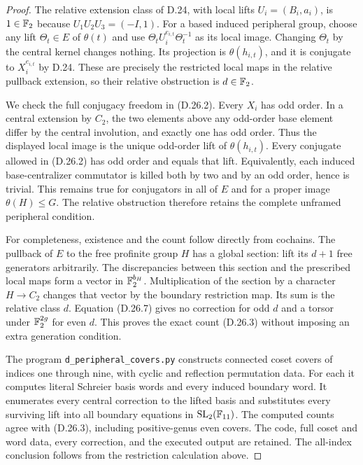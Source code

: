 \begin{proof}
The relative extension class of D.24, with local lifts
$U_i=(B_i,a_i)$, is $1\in\mathbb F_2$ because
$U_1U_2U_3=(-I,1)$.  For a based induced peripheral group,
choose any lift $\Theta_t\in E$ of $\theta(t)$ and use
$\Theta_t U_i^{e_{i,t}}\Theta_t^{-1}$ as its local image.
Changing $\Theta_t$ by the central kernel changes nothing.
Its projection is $\theta(h_{i,t})$, and it is conjugate to
$X_i^{e_{i,t}}$ by D.24.  These are precisely the restricted
local maps in the relative pullback extension, so their relative
obstruction is $d\in\mathbb F_2$.

We check the full conjugacy freedom in \textup{(D.26.2)}.
Every $X_i$ has odd order.  In a central extension by $C_2$,
the two elements above any odd-order base element differ by the
central involution, and exactly one has odd order.  Thus the
displayed local image is the unique odd-order lift of
$\theta(h_{i,t})$.  Every conjugate allowed in
\textup{(D.26.2)} has odd order and equals that lift.
Equivalently, each induced base-centralizer commutator is killed
both by two and by an odd order, hence is trivial.  This remains
true for conjugators in all of $E$ and for a proper image
$\theta(H)\leq G$.  The relative obstruction therefore retains
the complete unframed peripheral condition.

For completeness, existence and the count follow directly from
cochains.  The pullback of $E$ to the free profinite group $H$
has a global section: lift its $d+1$ free generators arbitrarily.
The discrepancies between this section and the prescribed local
maps form a vector in $\mathbb F_2^{b_H}$.  Multiplication of the
section by a character $H\to C_2$ changes that vector by the
boundary restriction map.  Its sum is the relative class $d$.
Equation \textup{(D.26.7)} gives no correction for odd $d$ and
a torsor under $\mathbb F_2^{2g}$ for even $d$.  This proves the exact
count \textup{(D.26.3)} without imposing an extra generation
condition.

The program \texttt{d\_peripheral\_covers.py} constructs
connected coset covers of indices one through nine, with cyclic
and reflection permutation data.  For each it computes literal
Schreier basis words and every induced boundary word.  It
enumerates every central correction to the lifted basis and
substitutes every surviving lift into all boundary equations
in $\operatorname{SL}_2(\mathbb F_{11})$.  The computed counts agree
with \textup{(D.26.3)}, including positive-genus even covers.
The code, full coset and word data, every correction, and the
executed output are retained.  The all-index conclusion follows
from the restriction calculation above.
\end{proof}

